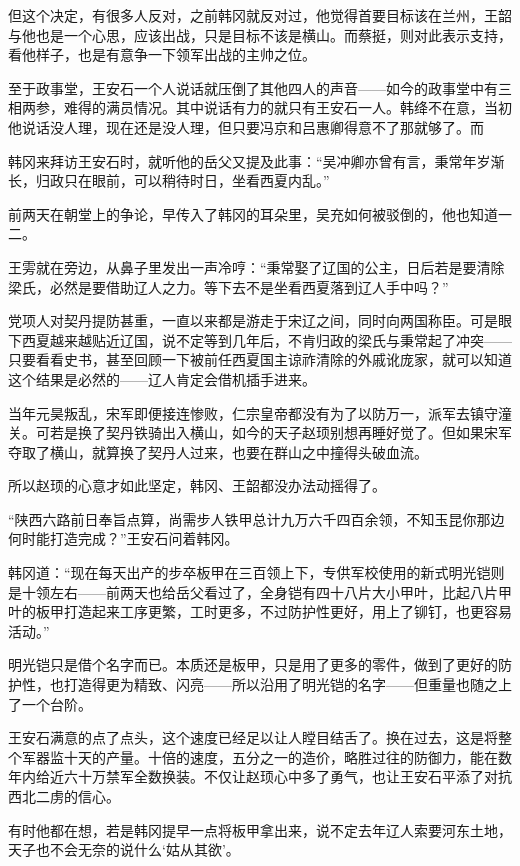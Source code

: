 但这个决定，有很多人反对，之前韩冈就反对过，他觉得首要目标该在兰州，王韶与他也是一个心思，应该出战，只是目标不该是横山。而蔡挺，则对此表示支持，看他样子，也是有意争一下领军出战的主帅之位。

至于政事堂，王安石一个人说话就压倒了其他四人的声音——如今的政事堂中有三相两参，难得的满员情况。其中说话有力的就只有王安石一人。韩绛不在意，当初他说话没人理，现在还是没人理，但只要冯京和吕惠卿得意不了那就够了。而

韩冈来拜访王安石时，就听他的岳父又提及此事：“吴冲卿亦曾有言，秉常年岁渐长，归政只在眼前，可以稍待时日，坐看西夏内乱。”

前两天在朝堂上的争论，早传入了韩冈的耳朵里，吴充如何被驳倒的，他也知道一二。

王雱就在旁边，从鼻子里发出一声冷哼：“秉常娶了辽国的公主，日后若是要清除梁氏，必然是要借助辽人之力。等下去不是坐看西夏落到辽人手中吗？”

党项人对契丹提防甚重，一直以来都是游走于宋辽之间，同时向两国称臣。可是眼下西夏越来越贴近辽国，说不定等到几年后，不肯归政的梁氏与秉常起了冲突——只要看看史书，甚至回顾一下被前任西夏国主谅祚清除的外戚讹庞家，就可以知道这个结果是必然的——辽人肯定会借机插手进来。

当年元昊叛乱，宋军即便接连惨败，仁宗皇帝都没有为了以防万一，派军去镇守潼关。可若是换了契丹铁骑出入横山，如今的天子赵顼别想再睡好觉了。但如果宋军夺取了横山，就算换了契丹人过来，也要在群山之中撞得头破血流。

所以赵顼的心意才如此坚定，韩冈、王韶都没办法动摇得了。

“陕西六路前日奉旨点算，尚需步人铁甲总计九万六千四百余领，不知玉昆你那边何时能打造完成？”王安石问着韩冈。

韩冈道：“现在每天出产的步卒板甲在三百领上下，专供军校使用的新式明光铠则是十领左右——前两天也给岳父看过了，全身铠有四十八片大小甲叶，比起八片甲叶的板甲打造起来工序更繁，工时更多，不过防护性更好，用上了铆钉，也更容易活动。”

明光铠只是借个名字而已。本质还是板甲，只是用了更多的零件，做到了更好的防护性，也打造得更为精致、闪亮——所以沿用了明光铠的名字——但重量也随之上了一个台阶。

王安石满意的点了点头，这个速度已经足以让人瞠目结舌了。换在过去，这是将整个军器监十天的产量。十倍的速度，五分之一的造价，略胜过往的防御力，能在数年内给近六十万禁军全数换装。不仅让赵顼心中多了勇气，也让王安石平添了对抗西北二虏的信心。

有时他都在想，若是韩冈提早一点将板甲拿出来，说不定去年辽人索要河东土地，天子也不会无奈的说什么‘姑从其欲’。


